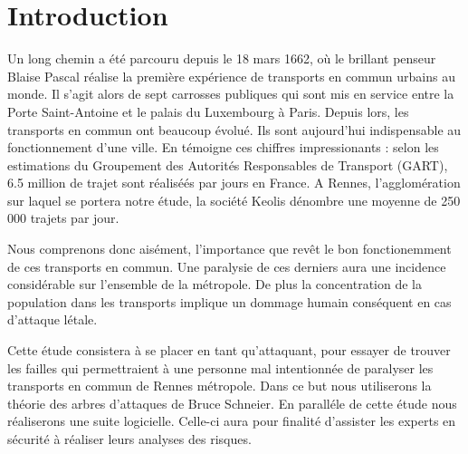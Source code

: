 \section{Introduction}
    Un long chemin a été parcouru depuis le 18 mars 1662, où le brillant penseur Blaise Pascal réalise la première expérience de transports en commun urbains au monde. Il s'agit alors de sept carrosses publiques qui sont mis en service entre la Porte Saint-Antoine et le palais du Luxembourg à Paris. Depuis lors, les transports en commun ont beaucoup évolué. Ils sont aujourd'hui indispensable au fonctionnement d'une ville. En témoigne ces chiffres impressionants : selon les estimations du Groupement des Autorités Responsables de Transport (GART), 6.5 million de trajet sont réaliséés par jours en France. A Rennes, l'agglomération sur laquel se portera notre étude, la société Keolis dénombre une moyenne de 250 000 trajets par jour. 

    Nous comprenons donc aisément, l'importance que revêt le bon fonctionemment de ces transports en commun. Une paralysie de ces derniers aura une incidence considérable sur l'ensemble de la métropole.  De plus la concentration de la population dans les transports implique un dommage humain conséquent en cas d'attaque létale.

    Cette étude consistera à se placer en tant qu'attaquant, pour essayer de trouver les failles qui permettraient à une personne mal intentionnée de paralyser les transports en commun de Rennes métropole. Dans ce but nous utiliserons la théorie des arbres d'attaques de Bruce Schneier. En paralléle de cette étude nous réaliserons une suite logicielle. Celle-ci aura pour finalité d'assister les experts en sécurité à réaliser leurs analyses des risques.
